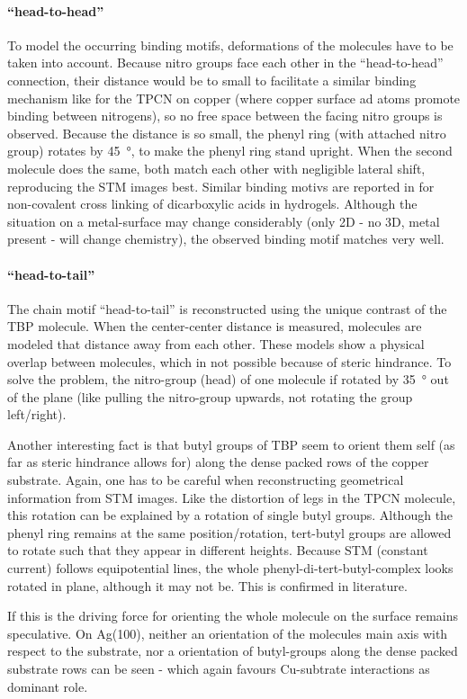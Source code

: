 \paragraph{``head-to-head''}
To model the occurring binding motifs, deformations of the molecules have to be taken into account. Because nitro groups face each other in the ``head-to-head'' connection, their distance would be to small to facilitate a similar binding mechanism like for the TPCN on copper (where copper surface ad atoms promote binding between nitrogens), so no free space between the facing nitro groups is observed. Because the distance is so small, the phenyl ring (with attached nitro group) rotates by \SI{45}{\degree}, to make the phenyl ring stand upright. When the second molecule does the same, both match each other with negligible lateral shift, reproducing the STM images best. Similar binding motivs are reported in \cite{kato_dispersive_2008} for non-covalent cross linking of dicarboxylic acids in hydrogels. Although the situation on a metal-surface may change considerably (only 2D - no 3D, metal present - will change chemistry), the observed binding motif matches very well.

\paragraph{``head-to-tail''}
The chain motif ``head-to-tail'' is reconstructed using the unique contrast of the TBP molecule. When the center-center distance is measured, molecules are modeled that distance away from each other. These models show a physical overlap between molecules, which in not possible because of steric hindrance. To solve the problem, the nitro-group (head) of one molecule if rotated by \SI{35}{\degree} out of the plane (like pulling the nitro-group upwards, not rotating the group left/right). 


Another interesting fact is that butyl groups of TBP seem to orient them self (as far as steric hindrance allows for) along the dense packed rows of the copper substrate. Again, one has to be careful when reconstructing geometrical information from STM images. Like the distortion of legs in the TPCN molecule, this rotation can be explained by a rotation of single butyl groups. Although the phenyl ring remains at the same position/rotation, tert-butyl groups are allowed to rotate such that they appear in different heights. Because STM (constant current) follows equipotential lines, the whole phenyl-di-tert-butyl-complex looks rotated in plane, although it may not be. This is confirmed in literature\cite{heim_surface-assisted_2010,heim_self-assembly_2010}.

If this is the driving force for orienting the whole molecule on the surface remains speculative. On Ag(100), neither an orientation of the molecules main axis with respect to the substrate, nor a orientation of butyl-groups along the dense packed substrate rows can be seen - which again favours Cu-subtrate interactions as dominant role.